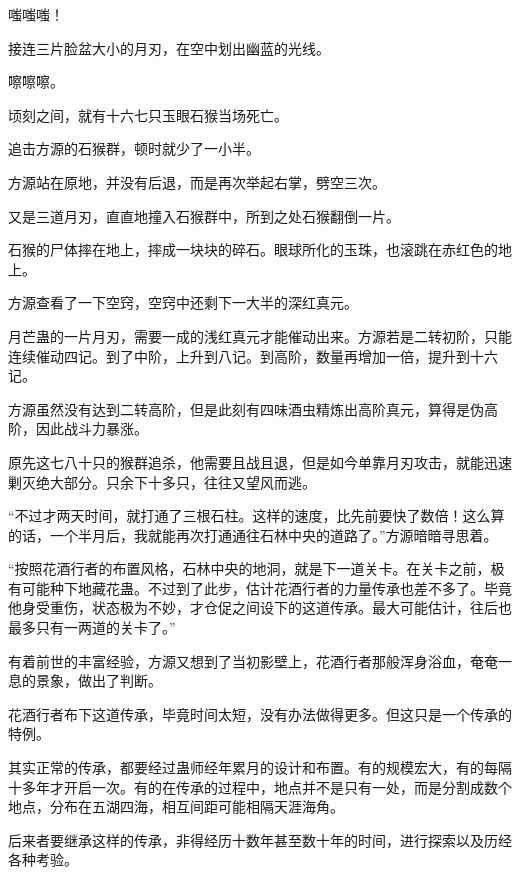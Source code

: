 
\begin{this_body}



嗤嗤嗤！

接连三片脸盆大小的月刃，在空中划出幽蓝的光线。

嚓嚓嚓。

顷刻之间，就有十六七只玉眼石猴当场死亡。

追击方源的石猴群，顿时就少了一小半。

方源站在原地，并没有后退，而是再次举起右掌，劈空三次。

又是三道月刃，直直地撞入石猴群中，所到之处石猴翻倒一片。

石猴的尸体摔在地上，摔成一块块的碎石。眼球所化的玉珠，也滚跳在赤红色的地上。

方源查看了一下空窍，空窍中还剩下一大半的深红真元。

月芒蛊的一片月刃，需要一成的浅红真元才能催动出来。方源若是二转初阶，只能连续催动四记。到了中阶，上升到八记。到高阶，数量再增加一倍，提升到十六记。

方源虽然没有达到二转高阶，但是此刻有四味酒虫精炼出高阶真元，算得是伪高阶，因此战斗力暴涨。

原先这七八十只的猴群追杀，他需要且战且退，但是如今单靠月刃攻击，就能迅速剿灭绝大部分。只余下十多只，往往又望风而逃。

“不过才两天时间，就打通了三根石柱。这样的速度，比先前要快了数倍！这么算的话，一个半月后，我就能再次打通通往石林中央的道路了。”方源暗暗寻思着。

“按照花酒行者的布置风格，石林中央的地洞，就是下一道关卡。在关卡之前，极有可能种下地藏花蛊。不过到了此步，估计花酒行者的力量传承也差不多了。毕竟他身受重伤，状态极为不妙，才仓促之间设下的这道传承。最大可能估计，往后也最多只有一两道的关卡了。”

有着前世的丰富经验，方源又想到了当初影壁上，花酒行者那般浑身浴血，奄奄一息的景象，做出了判断。

花酒行者布下这道传承，毕竟时间太短，没有办法做得更多。但这只是一个传承的特例。

其实正常的传承，都要经过蛊师经年累月的设计和布置。有的规模宏大，有的每隔十多年才开启一次。有的在传承的过程中，地点并不是只有一处，而是分割成数个地点，分布在五湖四海，相互间距可能相隔天涯海角。

后来者要继承这样的传承，非得经历十数年甚至数十年的时间，进行探索以及历经各种考验。


\end{this_body}
